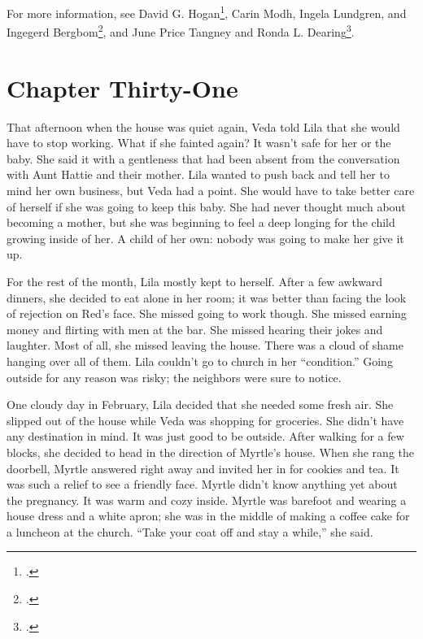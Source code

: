 \documentclass[
  letterpaper,
]{book}
\begin{document}
For more information, see David G. Hogan\footnote{.}, Carin Modh, Ingela Lundgren, and
Ingegerd Bergbom\footnote{.}, and June Price Tangney
and Ronda L. Dearing\footnote{.}.


\chapter{Chapter Thirty-One}\label{chapter-thirty-one}

That afternoon when the house was quiet again, Veda told Lila that she
would have to stop working. What if she fainted again? It wasn't safe
for her or the baby. She said it with a gentleness that had been absent
from the conversation with Aunt Hattie and their mother. Lila wanted to
push back and tell her to mind her own business, but Veda had a point.
She would have to take better care of herself if she was going to keep
this baby. She had never thought much about becoming a mother, but she
was beginning to feel a deep longing for the child growing inside of
her. A child of her own: nobody was going to make her give it up.

For the rest of the month, Lila mostly kept to herself. After a few
awkward dinners, she decided to eat alone in her room; it was better
than facing the look of rejection on Red's face. She missed going to
work though. She missed earning money and flirting with men at the bar.
She missed hearing their jokes and laughter. Most of all, she missed
leaving the house. There was a cloud of shame hanging over all of them.
Lila couldn't go to church in her ``condition.'' Going outside for any
reason was risky; the neighbors were sure to notice.

One cloudy day in February, Lila decided that she needed some fresh air.
She slipped out of the house while Veda was shopping for groceries. She
didn't have any destination in mind. It was just good to be outside.
After walking for a few blocks, she decided to head in the direction of
Myrtle's house. When she rang the doorbell, Myrtle answered right away
and invited her in for cookies and tea. It was such a relief to see a
friendly face. Myrtle didn't know anything yet about the pregnancy. It
was warm and cozy inside. Myrtle was barefoot and wearing a house dress
and a white apron; she was in the middle of making a coffee cake for a
luncheon at the church. ``Take your coat off and stay a while,'' she
said.
\end{document}
